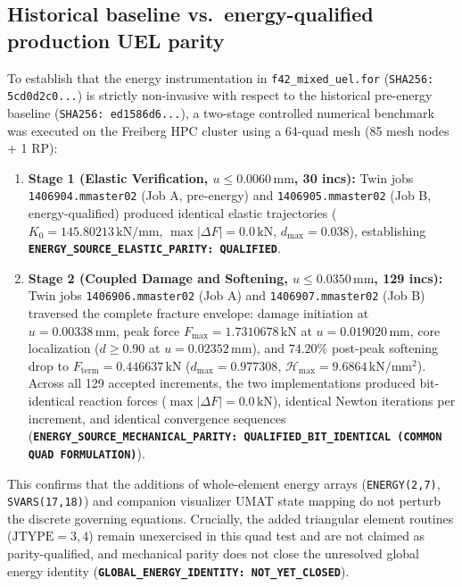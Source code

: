 \subsection{Historical baseline vs.\ energy-qualified production UEL parity}
To establish that the energy instrumentation in \nolinkurl{f42_mixed_uel.for} (\texttt{SHA256: 5cd0d2c0...}) is strictly non-invasive with respect to the historical pre-energy baseline (\texttt{SHA256: ed1586d6...}), a two-stage controlled numerical benchmark was executed on the Freiberg HPC cluster using a 64-quad mesh (85 mesh nodes + 1 RP):
\begin{enumerate}
  \item \textbf{Stage 1 (Elastic Verification, $u \le 0.0060\,\mathrm{mm}$, 30 incs):} Twin jobs \texttt{1406904.mmaster02} (Job A, pre-energy) and \texttt{1406905.mmaster02} (Job B, energy-qualified) produced identical elastic trajectories ($K_0 = 145.80213\,\mathrm{kN/mm}$, $\max|\Delta F| = 0.0\,\mathrm{kN}$, $d_{\max} = 0.038$), establishing \textbf{\texttt{ENERGY\_SOURCE\_ELASTIC\_PARITY: QUALIFIED}}.
  \item \textbf{Stage 2 (Coupled Damage and Softening, $u \le 0.0350\,\mathrm{mm}$, 129 incs):} Twin jobs \texttt{1406906.mmaster02} (Job A) and \texttt{1406907.mmaster02} (Job B) traversed the complete fracture envelope: damage initiation at $u = 0.00338\,\mathrm{mm}$, peak force $F_{\max} = 1.7310678\,\mathrm{kN}$ at $u = 0.019020\,\mathrm{mm}$, core localization ($d \ge 0.90$ at $u = 0.02352\,\mathrm{mm}$), and $74.20\%$ post-peak softening drop to $F_{\mathrm{term}} = 0.446637\,\mathrm{kN}$ ($d_{\max} = 0.977308$, $\mathcal{H}_{\max} = 9.6864\,\mathrm{kN/mm^2}$). Across all 129 accepted increments, the two implementations produced bit-identical reaction forces ($\max|\Delta F| = 0.0\,\mathrm{kN}$), identical Newton iterations per increment, and identical convergence sequences (\textbf{\texttt{ENERGY\_SOURCE\_MECHANICAL\_PARITY: QUALIFIED\_BIT\_IDENTICAL (COMMON QUAD FORMULATION)}}).
\end{enumerate}
This confirms that the additions of whole-element energy arrays (\texttt{ENERGY(2,7)}, \texttt{SVARS(17,18)}) and companion visualizer UMAT state mapping do not perturb the discrete governing equations. Crucially, the added triangular element routines ($\mathrm{JTYPE}=3,4$) remain unexercised in this quad test and are not claimed as parity-qualified, and mechanical parity does not close the unresolved global energy identity (\textbf{\texttt{GLOBAL\_ENERGY\_IDENTITY: NOT\_YET\_CLOSED}}).

